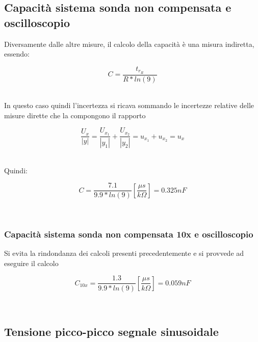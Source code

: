 \documentclass[a4paper]{article}
\begin{document}
\subsection{Capacità sistema sonda non compensata e oscilloscopio}
Diversamente dalle altre misure, il calcolo della capacità è una misura indiretta, essendo: 
\begin{Large}
	\begin{equation}
  		C= \frac{t_{r_R}}{R*ln(9)}
	\end{equation}
\end{Large}\\
In questo caso quindi l'incertezza si ricava sommando le incertezze relative delle misure dirette che la compongono il rapporto 
\begin{Large}
	\begin{equation}
  		\frac{U_x}{|y|}= \frac{U_{x_1}}{|y_1|}+\frac{U_{x_2}}{|y_2|}=u_{x_1}+u_{x_2}=u_x
	\end{equation}
\end{Large}\\
Quindi:
\begin{Large}
	\begin{equation}
  		C= \frac{7.1}{9.9*ln(9)} [\frac{\mu s}{k\Omega}]= 0.325nF
	\end{equation}
\end{Large}\\
\subsubsection{Capacità sistema sonda non compensata 10x e oscilloscopio }
Si evita la rindondanza dei calcoli presenti precedentemente e si provvede ad eseguire il calcolo
\begin{Large}
	\begin{equation}
  		C_{10x}= \frac{1.3}{9.9*ln(9)} [\frac{\mu s}{k\Omega}]= 0.059nF
	\end{equation}
\end{Large}\\

\subsection{Tensione picco-picco segnale sinusoidale} %
\end{document}

